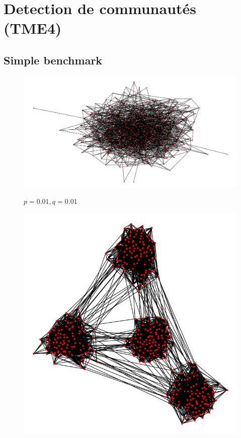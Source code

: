 \documentclass{report}
\begin{document}
\chapter{Detection de communautés (TME4)}

\section{Simple benchmark}

\begin{center}
  \begin{figure}[!h]
    \centering
    \includegraphics[width=0.3\paperwidth]{assets/0101.png}\\
    \caption*{$p=0.01, q=0.01$}
  \end{figure}
  \begin{figure}[!h]
    \centering
    \includegraphics[width=0.3\paperwidth]{assets/01001.png}\\

\end{figure}
\end{center}
\end{document}
